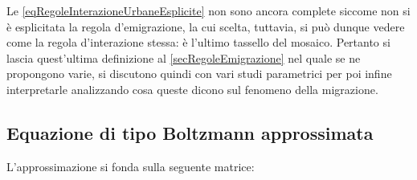                 \begin{oss}
                    Le \cref{eqRegoleInterazioneUrbaneEsplicite} non sono ancora complete siccome non si è esplicitata la regola d'emigrazione, la cui scelta, tuttavia, si può dunque vedere come la regola d'interazione stessa: è l'ultimo tassello del mosaico. Pertanto si lascia quest'ultima definizione al \cref{secRegoleEmigrazione} nel quale se ne propongono varie, si discutono quindi con vari studi parametrici per poi infine interpretarle analizzando cosa queste dicono sul fenomeno della migrazione.
                \end{oss}
            
        \subsection{Equazione di tipo Boltzmann approssimata}\label{secApprossimazione}

            L'approssimazione si fonda sulla seguente matrice:
            
